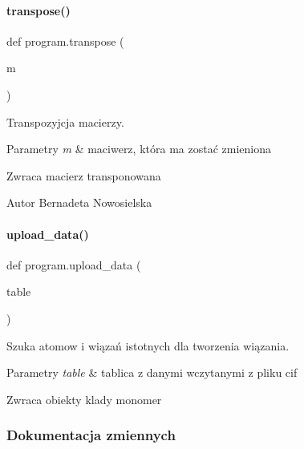 \paragraph{transpose()}
{\footnotesize\ttfamily def program.\+transpose (\begin{DoxyParamCaption}\item[{}]{m }\end{DoxyParamCaption})}



Transpozyjcja macierzy. 


\begin{DoxyParams}{Parametry}
{\em m} & maciwerz, która ma zostać zmieniona \\
\hline
\end{DoxyParams}
\begin{DoxyReturn}{Zwraca}
macierz transponowana 
\end{DoxyReturn}
\begin{DoxyAuthor}{Autor}
Bernadeta Nowosielska 
\end{DoxyAuthor}
\mbox{\label{namespaceprogram_a6916e63ac5b44ed1b9a69a3bcae5575e}} 
\paragraph{upload\+\_\+data()}
{\footnotesize\ttfamily def program.\+upload\+\_\+data (\begin{DoxyParamCaption}\item[{}]{table }\end{DoxyParamCaption})}



Szuka atomow i wiązań istotnych dla tworzenia wiązania. 


\begin{DoxyParams}{Parametry}
{\em table} & tablica z danymi wczytanymi z pliku cif \\
\hline
\end{DoxyParams}
\begin{DoxyReturn}{Zwraca}
obiekty klady monomer 
\end{DoxyReturn}


\subsubsection{Dokumentacja zmiennych}
\mbox{\label{namespaceprogram_aaac913534cc4f0ac2d38962f6f53f81c}} 
